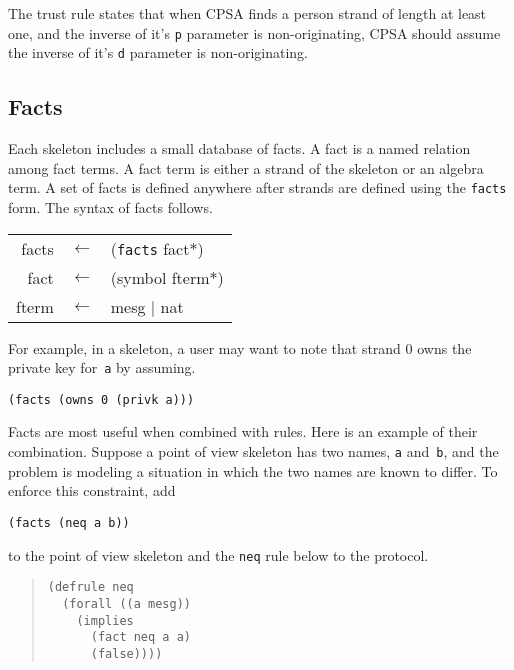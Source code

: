 \documentclass[12pt]{article}
\newcommand{\sym}[1]{\textup{\texttt{#1}}}
\begin{document}
The trust rule states that when CPSA finds a person strand of length
at least one, and the inverse of it's \texttt{p} parameter is
non-originating, CPSA should assume the inverse of it's \texttt{d}
parameter is non-originating.

\subsection{Facts}\label{sec:facts}
Each skeleton includes a small database of facts.  A fact is a named
relation among fact terms.  A fact term is either a
strand of the skeleton or an algebra term.  A set of facts is
defined anywhere after strands are defined using the \sym{facts} form.
The syntax of facts follows.

\begin{center}\scshape
  \begin{tabular}{rcl}
    facts&$\leftarrow$&(\sym{facts} fact$\ast$) \\
    fact&$\leftarrow$&(symbol fterm$\ast$) \\
    fterm&$\leftarrow$&mesg $\mid$ nat
  \end{tabular}
\end{center}

For example, in a skeleton, a user may want to note that strand 0 owns
the private key for~\texttt{a} by assuming.

\begin{center}
  \verb|(facts (owns 0 (privk a)))|
\end{center}

Facts are most useful when combined with rules.  Here is an example of
their combination.  Suppose a point of view skeleton has two names,
\texttt{a} and~\texttt{b}, and the problem is modeling a situation in
which the two names are known to differ.  To enforce this constraint, add
\begin{center}
  \verb|(facts (neq a b))|
\end{center}
to the point of view skeleton and the \texttt{neq} rule below to the
protocol.

\begin{quote}
\begin{verbatim}
(defrule neq
  (forall ((a mesg))
    (implies
      (fact neq a a)
      (false))))
\end{verbatim}
\end{quote}



\end{document}
